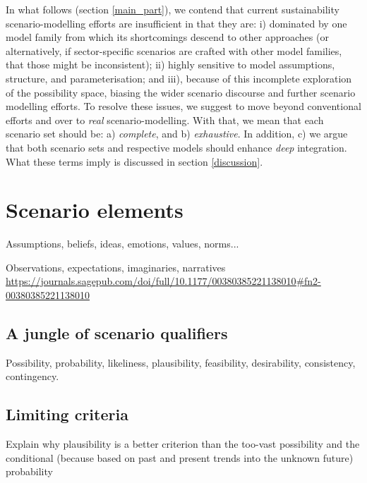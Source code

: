 \documentclass{article}
\begin{document}
\begin{refsection}
In what follows (section \ref{main_part}), we contend that current sustainability scenario-modelling efforts are insufficient in that they are: i) dominated by one model family from which its shortcomings descend to other approaches (or alternatively, if sector-specific scenarios are crafted with other model families, that those might be inconsistent); ii) highly sensitive to model assumptions, structure, and parameterisation; and iii), because of this incomplete exploration of the possibility space, biasing the wider scenario discourse and further scenario modelling efforts. To resolve these issues, we suggest to move beyond conventional efforts and over to \textit{real} scenario-modelling. With that, we mean that each scenario set should be: a) \textit{complete}, and b) \textit{exhaustive}. In addition, c) we argue that both scenario sets and respective models should enhance \textit{deep} integration. What these terms imply is discussed in section \ref{discussion}.

\section{Scenario elements}
Assumptions, beliefs, ideas, emotions, values, norms...

Observations, expectations, imaginaries, narratives \url{https://journals.sagepub.com/doi/full/10.1177/00380385221138010#fn2-00380385221138010}

\noindent{}

\subsection{A jungle of scenario qualifiers}
Possibility, probability, likeliness, plausibility, feasibility, desirability, consistency, contingency.

\subsection{Limiting criteria}
Explain why plausibility is a better criterion than the too-vast possibility and the conditional (because based on past and present trends into the unknown future) probability


\end{refsection}
\end{document}
